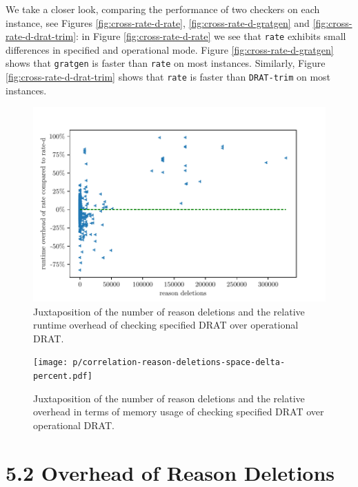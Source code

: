 \documentclass[
]{report}
\begin{document}
We take a closer look, comparing the performance of two checkers on each
instance, see Figures \ref{fig:cross-rate-d-rate},
\ref{fig:cross-rate-d-gratgen} and \ref{fig:cross-rate-d-drat-trim}: in
Figure \ref{fig:cross-rate-d-rate} we see that \texttt{rate} exhibits
small differences in specified and operational mode. Figure
\ref{fig:cross-rate-d-gratgen} shows that \texttt{gratgen} is faster
than \texttt{rate} on most instances. Similarly, Figure
\ref{fig:cross-rate-d-drat-trim} shows that \texttt{rate} is faster than
\texttt{DRAT-trim} on most instances.

\begin{figure}
\centering
\includegraphics{p/correlation-reason-deletions-time-delta-percent.pdf}
\caption{Juxtaposition of the number of reason deletions and the
relative runtime overhead of checking specified DRAT over operational
DRAT.\label{fig:correlation-reason-deletions-time-delta-percent}}
\end{figure}

\begin{figure}
\centering
\texttt{[image: p/correlation-reason-deletions-space-delta-percent.pdf]}
\caption{Juxtaposition of the number of reason deletions and the
relative overhead in terms of memory usage of checking specified DRAT
over operational
DRAT.\label{fig:correlation-reason-deletions-space-delta-percent}}
\end{figure}

\hypertarget{overhead-of-reason-deletions}{%
\section{5.2 Overhead of Reason
Deletions}\label{overhead-of-reason-deletions}}
\end{document}
